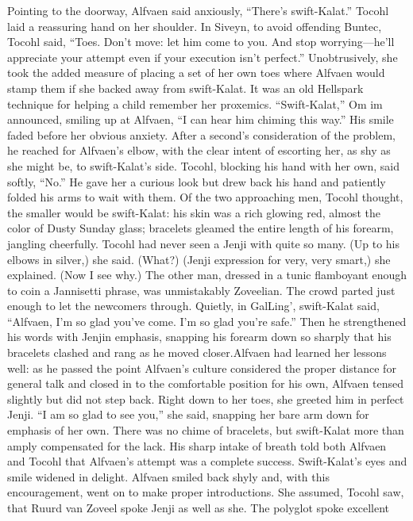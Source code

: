 \documentclass[9pt]{article}
\begin{document}
Pointing to the doorway, Alfvaen said anxiously, “There’s swift-Kalat.”
Tocohl laid a reassuring hand on her shoulder. In Siveyn, to avoid offending Buntec, Tocohl said,
“Toes. Don’t move: let him come to you. And stop worrying—he’ll appreciate your attempt even if your
execution isn’t perfect.” Unobtrusively, she took the added measure of placing a set of her own toes
where Alfvaen would stamp them if she backed away from swift-Kalat. It was an old Hellspark
technique for helping a child remember her proxemics.
“Swift-Kalat,” Om im announced, smiling up at Alfvaen, “I can hear him chiming this way.” His smile
faded before her obvious anxiety. After a second’s consideration of the problem, he reached for
Alfvaen’s elbow, with the clear intent of escorting her, as shy as she might be, to swift-Kalat’s side.
Tocohl, blocking his hand with her own, said softly, “No.” He gave her a curious look but drew back his
hand and patiently folded his arms to wait with them.
Of the two approaching men, Tocohl thought, the smaller would be swift-Kalat: his skin was a rich
glowing red, almost the color of Dusty Sunday glass; bracelets gleamed the entire length of his forearm,
jangling cheerfully. Tocohl had never seen a Jenji with quite so many. (Up to his elbows in silver,) she
said.
(What?)
(Jenji expression for very, very smart,) she explained. (Now I see why.)
The other man, dressed in a tunic flamboyant enough to coin a Jannisetti phrase, was unmistakably
Zoveelian.
The crowd parted just enough to let the newcomers through. Quietly, in GalLing’, swift-Kalat said,
“Alfvaen, I’m so glad you’ve come. I’m so glad you’re safe.” Then he strengthened his words with Jenjin
emphasis, snapping his forearm down so sharply that his bracelets clashed and rang as he moved closer.Alfvaen had learned her lessons well: as he passed the point Alfvaen’s culture considered the proper
distance for general talk and closed in to the comfortable position for his own, Alfvaen tensed slightly but
did not step back. Right down to her toes, she greeted him in perfect Jenji. “I am so glad to see you,”
she said, snapping her bare arm down for emphasis of her own.
There was no chime of bracelets, but swift-Kalat more than amply compensated for the lack. His
sharp intake of breath told both Alfvaen and Tocohl that Alfvaen’s attempt was a complete success.
Swift-Kalat’s eyes and smile widened in delight.
Alfvaen smiled back shyly and, with this encouragement, went on to make proper introductions. She
assumed, Tocohl saw, that Ruurd van Zoveel spoke Jenji as well as she. The polyglot spoke excellent
\end{document}
